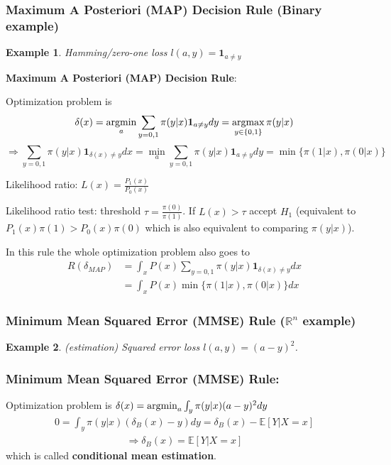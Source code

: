 \documentclass[11pt,a4paper]{article}
\newcommand{\argmax}{\operatornamewithlimits{argmax}}
\newcommand{\argmin}{\operatornamewithlimits{argmin}}
\newtheorem{example}{Example}
\begin{document}
\subsubsection{Maximum A Posteriori (MAP) Decision Rule (Binary example)}
\begin{example}
    Hamming/zero-one loss $l(a,y)=\mathbf{1}_{a\neq y}$
\end{example}

\textbf{Maximum A Posteriori (MAP) Decision Rule}:

Optimization problem is $$\delta(x)=\argmin_{a} \sum_{y=0,1} \pi(y|x) \mathbf{1}_{a\neq y} dy=\argmax_{y\in\{0,1\}}\pi(y|x)$$
$$\Rightarrow \sum_{y=0,1} \pi(y|x) \mathbf{1}_{\delta(x)\neq y} dx=\min_{a} \sum_{y=0,1} \pi(y|x) \mathbf{1}_{a\neq y} dy=\min\{\pi(1|x),\pi(0|x)\}$$

Likelihood ratio: $L(x)=\frac{P_1(x)}{P_0(x)}$

Likelihood ratio test: threshold $\tau=\frac{\pi(0)}{\pi(1)}$. If $L(x)>\tau$ accept $H_1$ (equivalent to $P_1(x)\pi(1)>P_0(x)\pi(0)$ which is also equivalent to comparing $\pi(y|x)$).

In this rule the whole optimization problem also goes to
\begin{equation}
    \begin{aligned}
        R(\delta_{MAP})&=\int_x P(x)\sum_{y=0,1} \pi(y|x) \mathbf{1}_{\delta(x)\neq y} dx\\
        &=\int_x P(x)\min\{\pi(1|x),\pi(0|x)\}dx
    \end{aligned}
    \nonumber
\end{equation}

\subsubsection{Minimum Mean Squared Error (MMSE) Rule ($\mathbb{R}^n$ example)}
\begin{example}
    (estimation) Squared error loss $l(a,y)=(a-y)^2$.
\end{example}
\subsubsection*{Minimum Mean Squared Error (MMSE) Rule:}
Optimization problem is $\delta(x)=\argmin_{a} \int_{y} \pi(y|x) (a-y)^2 dy$
\begin{equation}
    \begin{aligned}
        0=\int_{y} \pi(y|x) (\delta_B(x)-y) dy=\delta_B(x)-\mathbb{E}\left[Y|X=x\right]
    \end{aligned}
    \nonumber
\end{equation}
\begin{equation}
    \begin{aligned}
        \Rightarrow \delta_B(x)=\mathbb{E}\left[Y|X=x\right]
    \end{aligned}
    \nonumber
\end{equation}
which is called \textbf{conditional mean estimation}.
\end{document}
